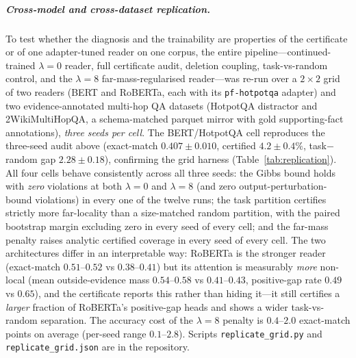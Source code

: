 \documentclass[10pt,twocolumn]{article}
\begin{document}
\subparagraph{Cross-model and cross-dataset replication.} To test whether the diagnosis and the trainability are properties of the certificate or of one adapter-tuned reader on one corpus, the entire pipeline---continued-trained $\lambda{=}0$ reader, full certificate audit, deletion coupling, task-vs-random control, and the $\lambda{=}8$ far-mass-regularised reader---was re-run over a $2\times2$ grid of two readers (BERT and RoBERTa, each with its \texttt{pf-hotpotqa} adapter) and two evidence-annotated multi-hop QA datasets (HotpotQA distractor and 2WikiMultiHopQA, a schema-matched parquet mirror with gold supporting-fact annotations), \emph{three seeds per cell}. The BERT/HotpotQA cell reproduces the three-seed audit above (exact-match $0.407\pm0.010$, certified $4.2\pm0.4\%$, task$-$random gap $2.28\pm0.18$), confirming the grid harness (Table~\ref{tab:replication}). All four cells behave consistently across all three seeds: the Gibbs bound holds with \emph{zero} violations at both $\lambda{=}0$ and $\lambda{=}8$ (and zero output-perturbation-bound violations) in every one of the twelve runs; the task partition certifies strictly more far-locality than a size-matched random partition, with the paired bootstrap margin excluding zero in every seed of every cell; and the far-mass penalty raises analytic certified coverage in every seed of every cell. The two architectures differ in an interpretable way: RoBERTa is the stronger reader (exact-match $0.51$--$0.52$ vs $0.38$--$0.41$) but its attention is measurably \emph{more} non-local (mean outside-evidence mass $0.54$--$0.58$ vs $0.41$--$0.43$, positive-gap rate $0.49$ vs $0.65$), and the certificate reports this rather than hiding it---it still certifies a \emph{larger} fraction of RoBERTa's positive-gap heads and shows a wider task-vs-random separation. The accuracy cost of the $\lambda{=}8$ penalty is $0.4$--$2.0$ exact-match points on average (per-seed range $0.1$--$2.8$). Scripts \texttt{replicate\_grid.py} and \texttt{replicate\_grid.json} are in the repository.
\end{document}
